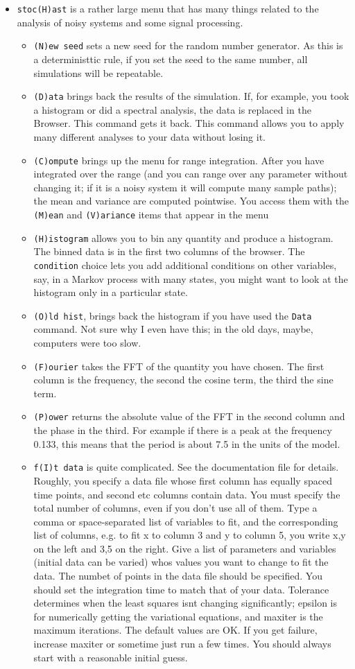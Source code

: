 \documentclass{article}
\begin{document}
\begin{itemize}
\item {\tt stoc(H)ast} is a rather large menu that has many things related to the analysis of noisy systems and some signal processing.
\begin{itemize}
\item {\tt (N)ew seed} sets a new seed for the random number generator. As this is a deterministtic rule, if you set the seed to the same number, all simulations will be repeatable.
\item {\tt (D)ata} brings back the results of the simulation. If, for example, you took a histogram or did a spectral analysis, the data is replaced in the Browser. This command gets it back. This command allows you to apply many different analyses to your data without losing it.
\item {\tt (C)ompute} brings up the menu for range integration. After you have integrated over the range (and you can range over any parameter without changing it; if it is a noisy system it will compute many sample paths); the mean and variance are computed pointwise. You access them with the {\tt (M)ean} and {\tt (V)ariance} items that appear in the menu
\item {\tt (H)istogram} allows you to bin any quantity and produce a histogram. The binned data is in the first two columns of the browser. The {\tt condition} choice lets you add additional conditions on other variables, say, in a Markov process with many states, you might want to look at the histogram only in a particular state. 
\item {\tt (O)ld hist}, brings back the histogram if you have used the {\tt Data} command. Not sure why I even have this; in the old days, maybe, computers were too slow.
\item {\tt (F)ourier} takes the FFT of the quantity you have chosen. The first column is the frequency, the second the cosine term, the third the sine term.  
\item {\tt (P)ower} returns the absolute value of the FFT in the second column and the phase in the third. For example if there is a peak at the frequency 0.133, this means that the period is about 7.5 in the units of the model.
\item {\tt f(I)t data} is quite complicated. See the documentation file for details. Roughly, you specify a data file whose first column has equally spaced time points, and second etc columns contain data. You must specify the total number of columns, even if you don't use all of them.  Type a comma or space-separated list of variables to fit, and the corresponding list of columns, e.g. to fit x to column 3 and y to column 5, you write x,y on the left and 3,5 on the right. Give a list of parameters and variables (initial data can be varied) whos values you want to change to fit the data.  The numbet of points in the data file should be specified. You should set the integration time to match that of your data.  Tolerance determines when the least squares isnt changing significantly; epsilon is for numerically getting the variational equations, and maxiter is the maximum iterations. The default values are OK. If you get failure, increase maxiter or sometime just run a few times. You should always start with a reasonable initial guess.

\end{itemize}
\end{itemize}
\end{document}
